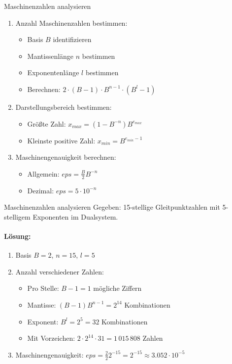 \begin{KR}{Maschinenzahlen analysieren}
\begin{enumerate}
    \item Anzahl Maschinenzahlen bestimmen:
    \begin{itemize}
        \item Basis $B$ identifizieren 
        \item Mantissenlänge $n$ bestimmen
        \item Exponentenlänge $l$ bestimmen
        \item Berechnen: $2 \cdot (B-1) \cdot B^{n-1} \cdot (B^l-1)$
    \end{itemize}
    \item Darstellungsbereich bestimmen:
    \begin{itemize}
        \item Größte Zahl: $x_{max} = (1-B^{-n})B^{e_{max}}$
        \item Kleinste positive Zahl: $x_{min} = B^{e_{min}-1}$
    \end{itemize}
    \item Maschinengenauigkeit berechnen:
    \begin{itemize}
        \item Allgemein: $eps = \frac{B}{2}B^{-n}$
        \item Dezimal: $eps = 5 \cdot 10^{-n}$
    \end{itemize}
\end{enumerate}
\end{KR}

\begin{example2}{Maschinenzahlen analysieren}
Gegeben: 15-stellige Gleitpunktzahlen mit 5-stelligem Exponenten im Dualsystem.

\paragraph{Lösung:}
\begin{enumerate}
    \item Basis $B=2$, $n=15$, $l=5$
    \item Anzahl verschiedener Zahlen:
    \begin{itemize}
        \item Pro Stelle: $B-1=1$ mögliche Ziffern
        \item Mantisse: $(B-1)B^{n-1} = 2^{14}$ Kombinationen
        \item Exponent: $B^l = 2^5 = 32$ Kombinationen
        \item Mit Vorzeichen: $2 \cdot 2^{14} \cdot 31 = 1\,015\,808$ Zahlen
    \end{itemize}
    \item Maschinengenauigkeit:
    $eps = \frac{2}{2}2^{-15} = 2^{-15} \approx 3.052 \cdot 10^{-5}$
\end{enumerate}
\end{example2}

